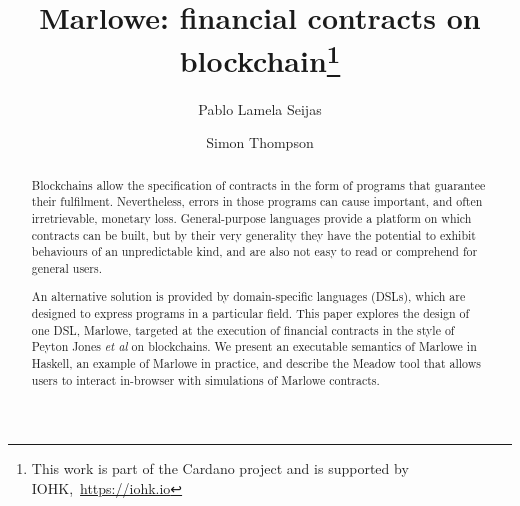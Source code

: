 \documentclass[runningheads]{llncs}
\begin{document}
%
%
\title {Marlowe: financial contracts on blockchain\thanks{This work is part of the Cardano project 
and is supported by IOHK,~\url{https://iohk.io}}}
%
%
\author{Pablo Lamela Seijas\\
\and Simon Thompson}
%
%


\begin{abstract}

Blockchains allow the specification of contracts in the form of programs that guarantee their fulfilment. 
Nevertheless, errors in those programs can cause important, and often irretrievable, monetary loss. General-purpose 
languages provide a platform on which contracts can be built, but by their very generality they have the potential to 
exhibit behaviours of an unpredictable kind, and are also not easy to read or comprehend for general users. 

An alternative solution is provided by domain-specific languages (DSLs), which are designed to express programs in a 
particular field. This paper explores the design of one DSL, Marlowe, targeted at the execution of financial 
contracts in the style of Peyton Jones \emph{et al} on blockchains. We present an executable semantics of Marlowe in 
Haskell, an example of Marlowe in practice, and describe the Meadow tool that allows users to interact in-browser with 
simulations of Marlowe contracts.

\end{abstract}



%
%


\maketitle

\end{document}
